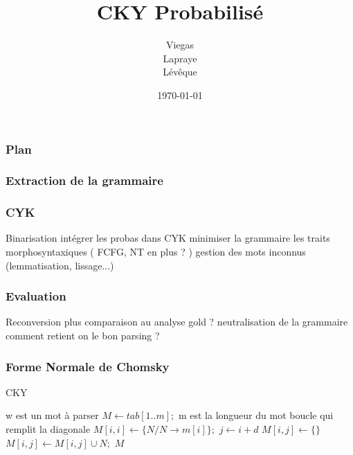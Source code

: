 \documentclass{beamer}
\begin{document}
\title{CKY Probabilisé}  %
\author{Viegas\\Lapraye\\Lévêque}

\date{\today}


\begin{frame}
 \maketitle
\end{frame}



\begin{frame} %
\frametitle{Plan}
\end{frame}

\begin{frame}
\frametitle{Extraction de la grammaire}

 
\end{frame}

\begin{frame}
 \frametitle{CYK}
 Binarisation 
 intégrer les probas dans CYK
 minimiser la grammaire
 les traits morphosyntaxiques ( FCFG, NT en plus ? )
 gestion des mots inconnus (lemmatisation, lissage...)
 
\end{frame}

\begin{frame}
\frametitle{Evaluation}
 Reconversion plus comparaison au analyse gold
? neutralisation de la grammaire
comment retient on le bon parsing ?
\end{frame}


\frametitle{Forme Normale de Chomsky}
\begin{algorithm}
\caption{CKY}
\label{cky}
	\small{\begin{algorithmic}
		 \Comment w est un mot à parser
			\State $M \gets tab[1..m];$ \Comment m est la longueur du mot
			 \Comment boucle qui remplit la diagonale
				\State $M[i, i] \gets \{ N / N \rightarrow m[i]\};$
						\State $j \gets i+d$
						\State $M[i, j] \gets \{\}$
									\State $M[i, j] \gets M[i, j] \cup N;$
								\EndFor
							\EndFor
						\EndFor
					\EndFor
				\EndFor
			\EndFor
			\State \Return $M$
		\EndFunction
	\end{algorithmic}}
\end{algorithm}
 
\end{document}
